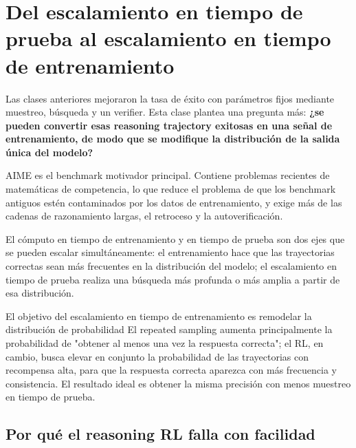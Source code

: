 \section{Del escalamiento en tiempo de prueba al escalamiento en tiempo de entrenamiento}

Las clases anteriores mejoraron la tasa de éxito con parámetros fijos mediante muestreo, búsqueda y un verifier. Esta clase plantea una pregunta más: \textbf{¿se pueden convertir esas reasoning trajectory exitosas en una señal de entrenamiento, de modo que se modifique la distribución de la salida única del modelo?}

AIME es el benchmark motivador principal. Contiene problemas recientes de matemáticas de competencia, lo que reduce el problema de que los benchmark antiguos estén contaminados por los datos de entrenamiento, y exige más de las cadenas de razonamiento largas, el retroceso y la autoverificación.


El cómputo en tiempo de entrenamiento y en tiempo de prueba son dos ejes que se pueden escalar simultáneamente: el entrenamiento hace que las trayectorias correctas sean más frecuentes en la distribución del modelo; el escalamiento en tiempo de prueba realiza una búsqueda más profunda o más amplia a partir de esa distribución.


\begin{importantbox}{El objetivo del escalamiento en tiempo de entrenamiento es remodelar la distribución de probabilidad}
El repeated sampling aumenta principalmente la probabilidad de "obtener al menos una vez la respuesta correcta"; el RL, en cambio, busca elevar en conjunto la probabilidad de las trayectorias con recompensa alta, para que la respuesta correcta aparezca con más frecuencia y consistencia. El resultado ideal es obtener la misma precisión con menos muestreo en tiempo de prueba.
\end{importantbox}

\subsection{Por qué el reasoning RL falla con facilidad}


